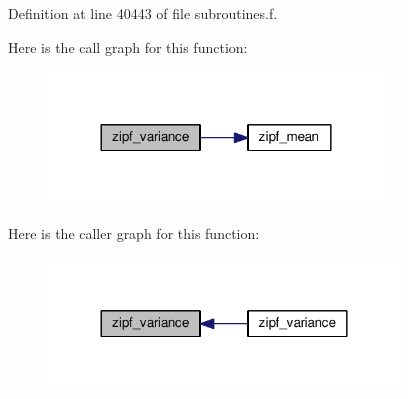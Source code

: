 Definition at line 40443 of file subroutines.\+f.



Here is the call graph for this function\+:\nopagebreak
\begin{figure}[H]
\begin{center}
\leavevmode
\includegraphics[width=252pt]{subroutines_8f_aaa5f46761caed5c5998401d0fbc17c58_cgraph}
\end{center}
\end{figure}




Here is the caller graph for this function\+:\nopagebreak
\begin{figure}[H]
\begin{center}
\leavevmode
\includegraphics[width=264pt]{subroutines_8f_aaa5f46761caed5c5998401d0fbc17c58_icgraph}
\end{center}
\end{figure}


